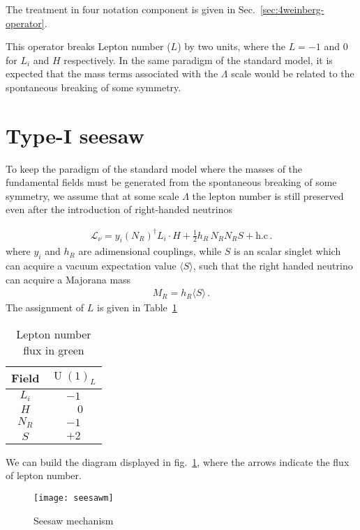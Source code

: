 The treatment in four notation component is given in Sec.~\ref{sec:4weinberg-operator}.


This operator breaks Lepton number ($L$) by two units, where the $L=-1$ and $0$ for $L_i$ and $H$ respectively.
In the same paradigm of the standard model, it is expected that the mass terms associated with the $\Lambda$ scale would be related to the spontaneous breaking of some symmetry. 



\section{Type-I seesaw}

To keep the paradigm of the standard model where the masses of the fundamental fields must be generated from the spontaneous breaking of some symmetry, we assume that at some scale $\Lambda$ the lepton number is still preserved even after the introduction of right-handed neutrinos
\begin{frame}
\begin{align}
  \mathcal{L}_{\nu}=y_{i} \left( N_R \right)^{\dagger} L_i\cdot  H   
  +\tfrac{1}{2} h_R\, N_R  N_R S + \text{h.c}\,.
\end{align}
where $y_i$ and $h_R$ are adimensional couplings, while $S$ is an scalar singlet which can acquire a vacuum expectation value $\langle S \rangle$, such that the right handed neutrino can acquire a Majorana mass
\begin{align}
  M_R=h_R \langle S \rangle\,.
\end{align}
The assignment of $L$ is given in Table~\ref{tab:Lassign}
\begin{table}
  \centering
  \begin{tabular}{c|c}
    Field& $\operatorname{U}(1)_L$\\ \hline
    $L_i$& $-1$ \\
    $H$& $\phantom{-}0$ \\
    $N_{R}$& $-1$ \\
    $S$&$+2$
  \end{tabular}
  \caption{Lepton number flux in green }
  \label{tab:Lassign}
\end{table}

We can build the diagram displayed in fig.~\ref{fig:lnv}, where the arrows indicate the flux of lepton number. 

\begin{figure}
  \centering
  \texttt{[image: seesawm]}
  \caption{Seesaw mechanism}
  \label{fig:lnv}
\end{figure}

\end{frame}
